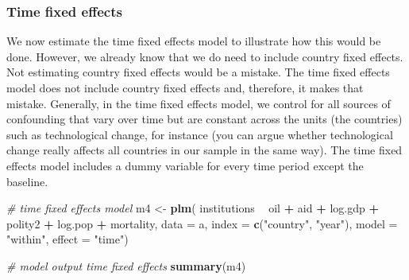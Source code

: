 \documentclass[]{article}
\newenvironment{Shaded}{\begin{snugshade}}{\end{snugshade}}
\newcommand{\KeywordTok}[1]{\textcolor[rgb]{0.13,0.29,0.53}{\textbf{#1}}}
\newcommand{\DataTypeTok}[1]{\textcolor[rgb]{0.13,0.29,0.53}{#1}}
\newcommand{\StringTok}[1]{\textcolor[rgb]{0.31,0.60,0.02}{#1}}
\newcommand{\CommentTok}[1]{\textcolor[rgb]{0.56,0.35,0.01}{\textit{#1}}}
\newcommand{\OperatorTok}[1]{\textcolor[rgb]{0.81,0.36,0.00}{\textbf{#1}}}
\newcommand{\NormalTok}[1]{#1}
\theoremstyle{definition}
\theoremstyle{definition}
\theoremstyle{definition}
\theoremstyle{remark}
\begin{document}
\subsubsection{Time fixed effects}\label{time-fixed-effects}

We now estimate the time fixed effects model to illustrate how this
would be done. However, we already know that we do need to include
country fixed effects. Not estimating country fixed effects would be a
mistake. The time fixed effects model does not include country fixed
effects and, therefore, it makes that mistake. Generally, in the time
fixed effects model, we control for all sources of confounding that vary
over time but are constant across the units (the countries) such as
technological change, for instance (you can argue whether technological
change really affects all countries in our sample in the same way). The
time fixed effects model includes a dummy variable for every time period
except the baseline.

\begin{Shaded}
\begin{Highlighting}[]
\CommentTok{# time fixed effects model}
\NormalTok{m4 <-}\StringTok{ }\KeywordTok{plm}\NormalTok{(}
\NormalTok{  institutions }\OperatorTok{~}\StringTok{ }\NormalTok{oil }\OperatorTok{+}\StringTok{ }\NormalTok{aid }\OperatorTok{+}\StringTok{ }\NormalTok{log.gdp }\OperatorTok{+}\StringTok{ }\NormalTok{polity2 }\OperatorTok{+}\StringTok{ }\NormalTok{log.pop }\OperatorTok{+}\StringTok{ }\NormalTok{mortality,}
  \DataTypeTok{data =}\NormalTok{ a,}
  \DataTypeTok{index =} \KeywordTok{c}\NormalTok{(}\StringTok{"country"}\NormalTok{, }\StringTok{"year"}\NormalTok{),}
  \DataTypeTok{model =} \StringTok{"within"}\NormalTok{,}
  \DataTypeTok{effect =} \StringTok{"time"}\NormalTok{)}

\CommentTok{# model output time fixed effects}
\KeywordTok{summary}\NormalTok{(m4)}
\end{Highlighting}
\end{Shaded}
\end{document}

